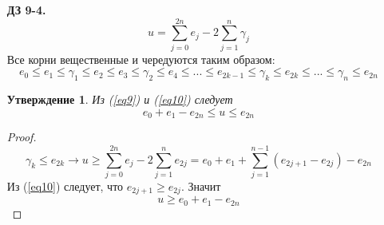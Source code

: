 \documentclass[12pt]{article}
\newtheorem{utv}{Утверждение}
\theoremstyle{definition}
\begin{document}
\begin{itemize}
\begin{proof}
\begin{equation}
        \end{equation}
        В силу (\ref{eq8}):
        \begin{equation}
            u_{xxxxx}=-(u^2)_{xx}=-(2uu_x)_x=-2u_x^2-2uu_{xx}
        \end{equation}
        \begin{equation*}
            (2uu_x)_{xxx}=2u_{xxx}u_x+6u_{xx}^2+6u_xu_{xxx}+2uu_{xxxx}=-8u^2u_x+6u_{xx}^2-4u^2u_x=-12u^2u_x+6u_{xx}^2
        \end{equation*}
        \begin{equation}
            -2u_x^2-12u^2u_x+6u_{xx}^2+4u^2u_x=0
        \end{equation}
        \begin{equation}
            \boxed{u_x^2+4u^2u_x-3u_{xx}^2=0}
        \end{equation}
        Получилась дополнительная связь и в результате нетривиальных решений не будет.
    \end{proof}
    \item[\textbf{ДЗ 9-4.}]
    \begin{equation}\label{eq9}
        u=\sum\limits_{j=0}^{2n}e_j-2\sum\limits_{j=1}^n\gamma_j
    \end{equation}
    Все корни вещественные и чередуются таким образом:
    \begin{equation}\label{eq10}
        e_0\leq e_1\leq \gamma_1\leq e_2\leq e_3\leq\gamma_2\leq e_4\leq ...\leq e_{2k-1}\leq \gamma_k\leq e_{2k}\leq ...\leq\gamma_n\leq e_{2n}
    \end{equation}
    \begin{utv}
    Из (\ref{eq9}) и (\ref{eq10}) следует
    \begin{equation}
        e_0+e_1-e_{2n}\leq u\leq e_{2n}
    \end{equation}
    \end{utv}
    \begin{proof}
        \begin{equation}
            \gamma_k\leq e_{2k}\rightarrow u\geq\sum\limits_{j=0}^{2n}e_j-2\sum\limits_{j=1}^ne_{2j}=e_0+e_1+\sum\limits_{j=1}^{n-1}(e_{2j+1}-e_{2j})-e_{2n}
        \end{equation}
        Из (\ref{eq10}) следует, что $e_{2j+1}\geq e_{2j}$. Значит
        \begin{equation}
            u\geq e_0+e_1-e_{2n}
        \end{equation}
        \begin{equation}

\end{equation}
\end{proof}
\end{itemize}
\end{document}
